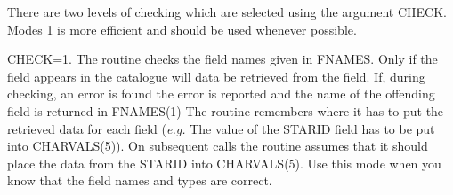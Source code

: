 \begin{small}
{{      There are two levels of checking which are selected using the argument
      CHECK. Modes 1 is more efficient and should be used whenever possible.

      CHECK=1. The routine checks the field names given in FNAMES. Only if
      the field appears in the catalogue will data be
      retrieved from the field. If, during
      checking, an error is found the error is reported and the name of the
      offending field is returned in FNAMES(1)
      The routine remembers where it has to put the retrieved data for each
      field ({\em e.g.} The value of the STARID field has to be put into CHARVALS(5)).
      On subsequent calls the routine assumes that it should place the data
      from the STARID into CHARVALS(5). Use this mode when you know that the
      field names and types are correct.

}}
\end{small}
